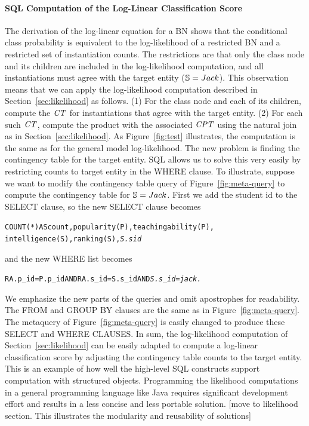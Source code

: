 \documentclass{acm_proc_article-sp}
\begin{document}
\paragraph{SQL Computation of the Log-Linear Classification Score}
The derivation of the log-linear equation for a BN shows that the conditional class probability is equivalent to the log-likelihood of a restricted BN and a restricted set of instantiation counts. The restrictions are that only the class node and its children are included in the log-likelihood computation, and all instantiations must agree with the target entity ($\S = Jack$). This observation means that we can apply the log-likelihood computation described in Section~\ref{sec:likelihood} as follows. %
(1) For the class node and each of its children, compute the $\cttable$ for instantiations that agree with the target entity. (2) For each such $\cttable$, compute the product with the associated $\cptable$ using the natural join as in Section~\ref{sec:likelihood}. As Figure~\ref{fig:test} illustrates, the computation is the same as for the general model log-likelihood. The new problem is finding the contingency table for the target entity. SQL allows us to solve this very easily by restricting counts to target entity in the WHERE clause. To illustrate, suppose we want to modify the contingency table query of Figure~\ref{fig:meta-query} to compute the contingency table for $\S = Jack$. First we add the student id to the SELECT clause, so the new SELECT clause becomes

\begin{alltt}
COUNT(*) AS count, popularity(P), teachingability(P),
intelligence(S), ranking(S), \em{S.sid}
\end{alltt}

and the new WHERE list becomes

\begin{alltt}
RA.p\_id = P.p\_id AND RA.s\_id = S.s\_id AND \em{S.s\_id = jack}.
\end{alltt}

We emphasize the new parts of the queries and omit apostrophes for readability. The FROM and GROUP BY clauses are the same as in Figure~\ref{fig:meta-query}. The metaquery of Figure~\ref{fig:meta-query} is easily changed to produce these SELECT and WHERE CLAUSES. 
In sum, the log-likelihood computation of Section~\ref{sec:likelihood} can be easily adapted to compute a log-linear classification score by adjusting the contingency table counts to the target entity. This is an example of how well the high-level SQL constructs support computation with structured objects. Programming the likelihood computations in a general programming language like Java requires significant development effort and results in a less concise and less portable solution. [move to likelihood section. This illustrates the modularity and reusability of solutions]
\end{document}
